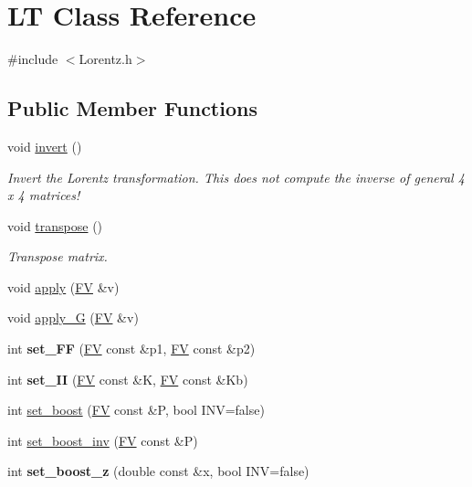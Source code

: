 \hypertarget{classLT}{\section{L\-T Class Reference}
\label{classLT}
}


{\ttfamily \#include $<$Lorentz.\-h$>$}

\subsection*{Public Member Functions}
\begin{DoxyCompactItemize}
\item 
\hypertarget{classLT_a7467f60d847896710f21c17be6ee0b2c}{void \hyperlink{classLT_a7467f60d847896710f21c17be6ee0b2c}{invert} ()}\label{classLT_a7467f60d847896710f21c17be6ee0b2c}

\begin{DoxyCompactList}\small\item\em Invert the Lorentz transformation. This does not compute the inverse of general 4 x 4 matrices! \end{DoxyCompactList}\item 
\hypertarget{classLT_a6142dba94f0edc4eb2f8a0cc84a43ada}{void \hyperlink{classLT_a6142dba94f0edc4eb2f8a0cc84a43ada}{transpose} ()}\label{classLT_a6142dba94f0edc4eb2f8a0cc84a43ada}

\begin{DoxyCompactList}\small\item\em Transpose matrix. \end{DoxyCompactList}\item 
void \hyperlink{classLT_a3119b968c2cf6a9bbfb30615c01921d0}{apply} (\hyperlink{classFV}{F\-V} \&v)
\item 
void \hyperlink{classLT_abd17d410a8436a83b03f2dd2909ee59a}{apply\-\_\-\-G} (\hyperlink{classFV}{F\-V} \&v)
\item 
\hypertarget{classLT_acdccba2ab08b071219626bafb85f8e21}{int {\bfseries set\-\_\-\-F\-F} (\hyperlink{classFV}{F\-V} const \&p1, \hyperlink{classFV}{F\-V} const \&p2)}\label{classLT_acdccba2ab08b071219626bafb85f8e21}

\item 
\hypertarget{classLT_ac2718d29c891a91aa5058dc929ffecdd}{int {\bfseries set\-\_\-\-I\-I} (\hyperlink{classFV}{F\-V} const \&K, \hyperlink{classFV}{F\-V} const \&Kb)}\label{classLT_ac2718d29c891a91aa5058dc929ffecdd}

\item 
int \hyperlink{classLT_a0f1f4b9fb6a2b084908abb6bc687cd4f}{set\-\_\-boost} (\hyperlink{classFV}{F\-V} const \&P, bool I\-N\-V=false)
\item 
int \hyperlink{classLT_a84cf79cd6014d4ecc645c1dcc0258b5e}{set\-\_\-boost\-\_\-inv} (\hyperlink{classFV}{F\-V} const \&P)
\item 
\hypertarget{classLT_a7dce276751d25954b2d249516d5191a4}{int {\bfseries set\-\_\-boost\-\_\-z} (double const \&x, bool I\-N\-V=false)}\label{classLT_a7dce276751d25954b2d249516d5191a4}


\end{DoxyCompactItemize}
